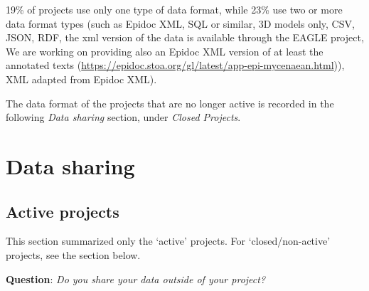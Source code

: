 \documentclass[
  12pt,
]{scrreprt}
\begin{document}
19\% of projects use only one type of data format, while 23\% use two or
more data format types (such as Epidoc XML, SQL or similar, 3D models
only, CSV, JSON, RDF, the xml version of the data is available through
the EAGLE project, We are working on providing also an Epidoc XML
version of at least the annotated texts
(\url{https://epidoc.stoa.org/gl/latest/app-epi-mycenaean.html})), XML
adapted from Epidoc XML).

The data format of the projects that are no longer active is recorded in
the following \emph{Data sharing} section, under \emph{Closed Projects}.

\hypertarget{data-sharing-1}{%
\section{Data sharing}\label{data-sharing-1}}

\hypertarget{active-projects}{%
\subsection{Active projects}\label{active-projects}}

This section summarized only the `active' projects. For
`closed/non-active' projects, see the section below.

\textbf{Question}: \emph{Do you share your data outside of your
project?}
\end{document}
